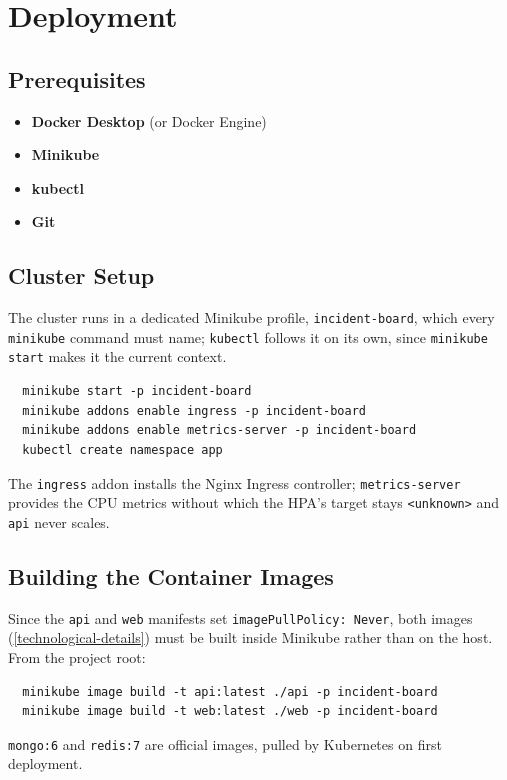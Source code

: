 \documentclass{scrartcl}
\begin{document}
\section{Deployment}\label{deployment}
\subsection{Prerequisites}\label{prerequisites}

\begin{itemize}
  \item \textbf{Docker Desktop} (or Docker Engine)
  \item \textbf{Minikube}
  \item \textbf{kubectl}
  \item \textbf{Git}
\end{itemize}

\subsection{Cluster Setup}\label{cluster-setup}

The cluster runs in a dedicated Minikube profile, \texttt{incident-board}, which every \texttt{minikube} command must name; \texttt{kubectl} follows it on its own, since \texttt{minikube start} makes it the current context.
%
\begin{verbatim}
  minikube start -p incident-board
  minikube addons enable ingress -p incident-board
  minikube addons enable metrics-server -p incident-board
  kubectl create namespace app
\end{verbatim}
%
The \texttt{ingress} addon installs the Nginx Ingress controller; \texttt{metrics-server} provides the CPU metrics without which the HPA's target stays \texttt{<unknown>} and \texttt{api} never scales.

\subsection{Building the Container Images}\label{building-images}

Since the \texttt{api} and \texttt{web} manifests set \texttt{imagePullPolicy: Never}, both images (\cref{technological-details}) must be built inside Minikube rather than on the host. From the project root:
%
\begin{verbatim}
  minikube image build -t api:latest ./api -p incident-board
  minikube image build -t web:latest ./web -p incident-board
\end{verbatim}
%
\texttt{mongo:6} and \texttt{redis:7} are official images, pulled by Kubernetes on first deployment.
\end{document}
